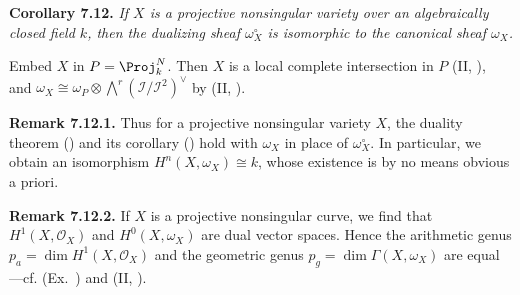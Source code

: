 {\medskip
\noindent\hypertarget{result-III-7.12}{}\textbf{Corollary 7.12.} \emph{If $X$ is a projective nonsingular variety over an algebraically closed field $k$, then the dualizing sheaf $\omega_X^\circ$ is isomorphic to the canonical sheaf $\omega_X$.}

\Proof Embed $X$ in $P=\Proj_k^N$. Then $X$ is a local complete intersection in $P$ (II, ), and $\omega_X\cong\omega_P\otimes\bigwedge^r(\mathcal I/\mathcal I^2)^\vee$ by (II, ).

\medskip
\noindent\hypertarget{result-III-7.12.1}{}\textbf{Remark 7.12.1.} Thus for a projective nonsingular variety $X$, the duality theorem () and its corollary () hold with $\omega_X$ in place of $\omega_X^\circ$. In particular, we obtain an isomorphism $H^n(X,\omega_X)\cong k$, whose existence is by no means obvious a priori.

\medskip
\noindent\hypertarget{result-III-7.12.2}{}\textbf{Remark 7.12.2.} If $X$ is a projective nonsingular curve, we find that $H^1(X,\mathcal O_X)$ and $H^0(X,\omega_X)$ are dual vector spaces. Hence the arithmetic genus $p_a=\dim H^1(X,\mathcal O_X)$ and the geometric genus $p_g=\dim\Gamma(X,\omega_X)$ are equal---cf. (Ex.~) and (II, ).
}
